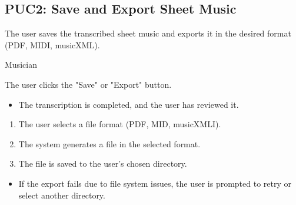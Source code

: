 \documentclass[12pt]{article}
\begin{document}
\subsection*{PUC2: Save and Export Sheet Music}
\begin{description}[style=nextline]
    \item[Description:] The user saves the transcribed sheet music and exports it in the desired format (PDF, MIDI, musicXML).
    \item[Primary Actor:] Musician
    \item[Trigger:] The user clicks the "Save" or "Export" button.
    \item[Preconditions:]
    \begin{itemize}
        \item The transcription is completed, and the user has reviewed it.
    \end{itemize}
    \item[Main Success Scenario:]
    \begin{enumerate}
        \item The user selects a file format (PDF, MID, musicXMLI).
        \item The system generates a file in the selected format.
        \item The file is saved to the user’s chosen directory.
    \end{enumerate}
    \item[Exceptions:]
    \begin{itemize}
        \item If the export fails due to file system issues, the user is prompted to retry or select another directory.
    \end{itemize}
\end{description}
\end{document}
